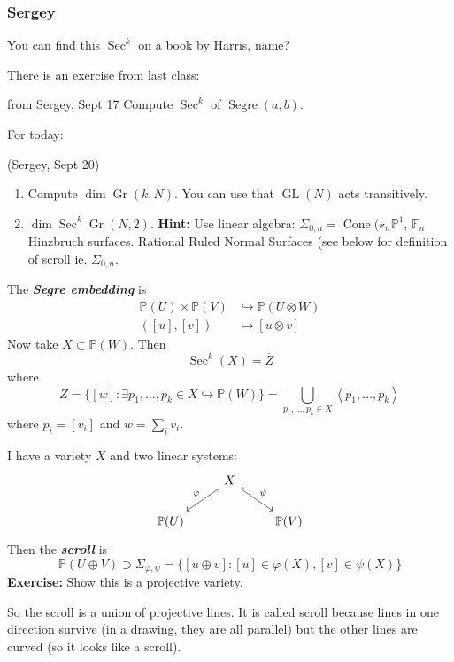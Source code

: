 \subsubsection{Sergey}

You can find this $\operatorname{Sec}^k$ on a book by Harris, name?

There is an exercise from last class:
\begin{manualexercise}{from Sergey, Sept 17}
	Compute $\operatorname{Sec}^k $ of $\operatorname{Segre}(a,b)$.
\end{manualexercise}

For today:
\begin{manualexercise}{(Sergey, Sept 20)}\leavevmode 
	\begin{enumerate}[label=\alph*.]
		\item Compute $\dim \operatorname{Gr}(k,N)$. You can use that $\operatorname{GL}(N)$ acts transitively.
		\item $\dim \operatorname{Sec}^k\operatorname{Gr}(N,2)$. \textbf{Hint:} Use linear algebra: $\Sigma_{0,n}=\operatorname{Cone}(\mathcal{v}_{n}\mathbb{P}^1$, $\mathbb{F}_{n}$ Hinzbruch surfaces. Rational Ruled Normal Surfaces (see below for definition of scroll ie. $\Sigma_{0,n}$.
	\end{enumerate}
\end{manualexercise}

\begin{defn}
	The \textit{\textbf{Segre embedding }} is 
	 \begin{align*}
		 \mathbb{P}(U)\times \mathbb{P}(V)&\hookrightarrow \mathbb{P}(U\otimes W)  \\
		 ([u],[v]) &\longmapsto [u\otimes v]
	\end{align*}
	Now take $X\subset \mathbb{P}(W)$. Then
	\[\operatorname{Sec}^k(X)=\overline{Z}\]
	where
	\[Z=\{[w]:\exists p_1,\ldots,p_k\in X\hookrightarrow \mathbb{P}(W)\} =\bigcup_{p_1,\ldots,p_k\in X}\left<p_1,\ldots,p_k\right>  \]
	where $p_i=[v_i]$ and $w=\sum_{i}v_i$.
\end{defn}

\begin{defn}[Scroll]
	I have a variety $X$ and two linear systems:
	\[\begin{tikzcd}
	&X\arrow[dl,"\varphi",hook,swap]\arrow[dr,"\psi",hook]\\
	\mathbb{P}(U)&&\mathbb{P}(V)
	\end{tikzcd}\]
	Then the \textit{\textbf{scroll}} is
	\[\mathbb{P}(U\oplus V)\supset\Sigma_{\varphi,\psi}=\{[u\oplus v]:[u]\in\varphi(X),[v]\in\psi(X)\}\]
	\textbf{Exercise:} Show this is a projective variety.

	So the scroll is a union of projective lines. It is called scroll because lines in one direction survive (in a drawing, they are all parallel) but the other lines are curved (so it looks like a scroll).
\end{defn}

